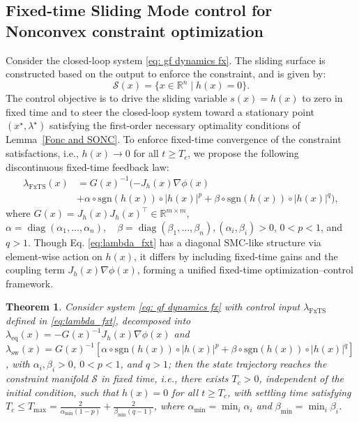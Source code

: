 \documentclass[letterpaper, 10 pt, conference]{ieeeconf}
\newtheorem{theorem}{Theorem}
\begin{document}
\subsection{Fixed-time Sliding Mode control for Nonconvex constraint optimization}
Consider  the closed-loop system \eqref{eq: gf dynamics fx}. The sliding surface is constructed based on the output to enforce the constraint, and is given by:
\begin{equation}\label{eq: SF1}
\mathcal{S}(x) = \{x \in \mathbb{R}^n \mid h(x) = 0\}.
\end{equation}
The control objective is to drive the sliding variable $s(x)=h(x)$ to zero in fixed time and to steer the closed-loop system toward a stationary point $(x^\star,\lambda^\star)$ satisfying the first-order necessary optimality conditions of Lemma~\ref{Fonc and SONC}. To enforce fixed-time convergence of the  constraint satisfactions, i.e., $h(x)\to 0$ for all $t \geq T_c$, we propose the following discontinuous fixed-time feedback law:
\begin{align}
    \label{eq:lambda_fxt}
\lambda_{\mathrm{FxTS}}(x)&= G(x)^{-1}(- J_h(x)\nabla \phi(x) \nonumber\\
&+\!\alpha \circ \mathrm{sgn}(h(x))\! \circ \!|h(x)|^{p} + \beta \circ \mathrm{sgn}(h(x)) \!\circ\! |h(x)|^{q}),
\end{align} 
where $G(x)=J_h(x)J_h(x)^\top \in \mathbb{R}^{m\times m}$, $\alpha = \operatorname{diag}(\alpha_1,\dots,\alpha_n), \quad \beta = \operatorname{diag}(\beta_1,\dots,\beta_n), (\alpha_i,\beta_i)>0$, $0<p<1$, and $q>1$. Though Eq. \eqref{eq:lambda_fxt} has a diagonal SMC-like structure via element-wise action on $h(x)$, it differs by including fixed-time gains and the coupling term $J_h(x)\nabla \phi(x)$, forming a unified fixed-time optimization–control framework.
\begin{theorem}
Consider system \eqref{eq: gf dynamics fx} with control input $\lambda_{\mathrm{FxTS}}$ defined in \eqref{eq:lambda_fxt}, decomposed into $\lambda_{\mathrm{eq}}(x) = -G(x)^{-1}J_h(x)\nabla \phi(x)$ and $\lambda_{\mathrm{sw}}(x) = G(x)^{-1}\!\left[\alpha \circ \mathrm{sgn}(h(x)) \circ |h(x)|^{p} + \beta \circ \mathrm{sgn}(h(x)) \circ |h(x)|^{q}\right]$, with $\alpha_i,\beta_i>0$, $0<p<1$, and $q>1$; then the state trajectory reaches the constraint manifold $\mathcal{S}$ in fixed time, i.e., there exists $T_c>0$, independent of the initial condition, such that $h(x)=0$ for all $t\ge T_c$, with settling time satisfying $T_c \le T_{\max}= \frac{2}{\alpha_{\min}(1-p)} + \frac{2}{\beta_{\min}(q-1)}$, where $\alpha_{\min}=\min_i \alpha_i$ and $\beta_{\min}=\min_i \beta_i$.
\end{theorem}
\end{document}
